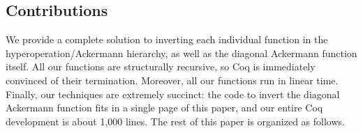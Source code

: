 \subsection{Contributions}
We provide a complete solution to inverting each individual function in the hyperoperation/Ackermann hierarchy,
as well as the diagonal Ackermann function itself.  All our functions are structurally recursive, so
Coq is immediately convinced of their termination.  Moreover, all our functions run in linear
time.  Finally, our techniques are extremely succinct: the code to invert the diagonal Ackermann function fits in a single page of this paper, and our entire Coq development is about 1,000 lines. The rest of this paper is organized as follows.
